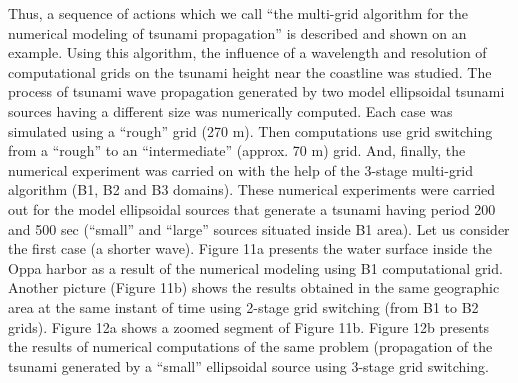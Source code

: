 \documentclass{aip-cp}
\begin{document}
Thus, a sequence of actions which we call ``the multi-grid algorithm for the 
numerical modeling of tsunami propagation'' is described and shown on an 
example. Using this algorithm, the influence of a wavelength and resolution 
of computational grids on the tsunami height near the coastline was studied. 
The process of tsunami wave propagation generated by two model ellipsoidal 
tsunami sources having a different size was numerically computed. Each case 
was simulated using a ``rough'' grid (270 m). Then computations use grid 
switching from a ``rough'' to an ``intermediate'' (approx. 70 m) grid. And, 
finally, the numerical experiment was carried on with the help of the 
3-stage multi-grid algorithm (B1, B2 and B3 domains). These numerical 
experiments were carried out for the model ellipsoidal sources that generate 
a tsunami having period 200 and 500 sec (``small'' and ``large'' sources situated inside B1 area). 
Let us consider the first case (a shorter wave). Figure 11a presents the 
water surface inside the Oppa harbor as a result of the numerical modeling 
using B1 computational grid. Another picture (Figure 11b) shows the results 
obtained in the same geographic area at the same instant of time using 
2-stage grid switching (from B1 to B2 grids). Figure 12a shows a zoomed segment 
of Figure 11b. Figure 12b presents the results of numerical computations of 
the same problem (propagation of the tsunami generated by a ``small'' 
ellipsoidal source using 3-stage grid switching. 
\end{document}
